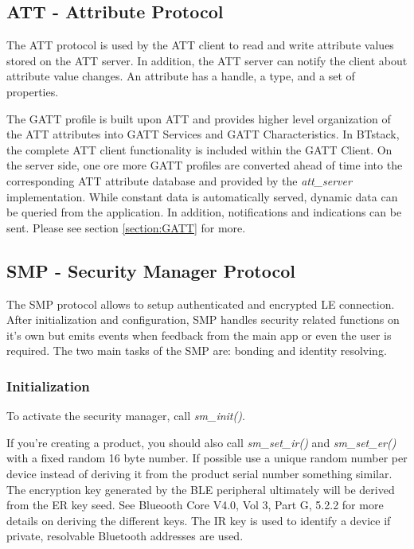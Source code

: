 \subsection{ATT - Attribute Protocol}

The ATT protocol is used by the ATT client to read and write attribute values stored on the ATT server. In addition, the ATT server can notify the client about attribute value changes. An attribute has a handle, a type, and a set of properties.

The GATT profile is built upon ATT and provides higher level organization of the ATT attributes into GATT Services and GATT Characteristics. In BTstack, the complete ATT client functionality is included within the GATT Client. On the server side, one ore more GATT profiles are converted ahead of time into the corresponding ATT attribute database and provided by the \emph{att\_server} implementation. While constant data is automatically served, dynamic data can be queried from the application. In addition, notifications and indications can be sent. Please see section \ref{section:GATT} for more.

\subsection{SMP - Security Manager Protocol }
\label{subsection:smp}

The SMP protocol allows to setup authenticated and encrypted LE connection. After initialization and configuration, SMP handles security related functions on it's own but emits events when feedback from the main app or even the user is required. The two main tasks of the SMP are: bonding and identity resolving.

\subsubsection{Initialization}

To activate the security manager, call \emph{sm\_init()}. 

If you're creating a product, you should also call \emph{sm\_set\_ir()} and \emph{sm\_set\_er()} with a fixed random 16 byte number. If possible use a unique random number per device instead of deriving it from the product serial number something similar. The encryption key generated by the BLE peripheral ultimately will be derived from the ER key seed. See Blueooth Core V4.0, Vol 3, Part G, 5.2.2 for more details on deriving the different keys. The IR key is used to identify a device if private, resolvable Bluetooth addresses are used.

